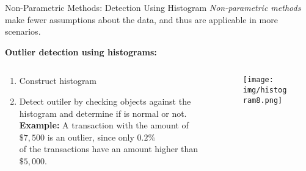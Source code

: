 \begin{frame}{Non-Parametric Methods: Detection Using Histogram}
	\textit{Non-parametric methods} make fewer assumptions about the data, and thus are applicable in more scenarios.\\\bigskip

	\textbf{Outlier detection using histograms:}
	\begin{columns}
		\begin{column}{0.7\textwidth}
			\vspace*{-1em}
			\begin{enumerate}
				\item Construct histogram
				\item Detect outiler by checking objects against the histogram and determine if is normal or not.\\
				      \textbf{Example:} A transaction with the amount of $\$7,500$ is an outlier, since only $0.2\%$ \\ of the transactions have an amount higher than $\$5,000$.
			\end{enumerate}
		\end{column}
		\begin{column}{0.3\textwidth}
			\begin{figure}
				\centering
				\texttt{[image: img/histogram8.png]}
			\end{figure}
		\end{column}
	\end{columns}
\end{frame}


